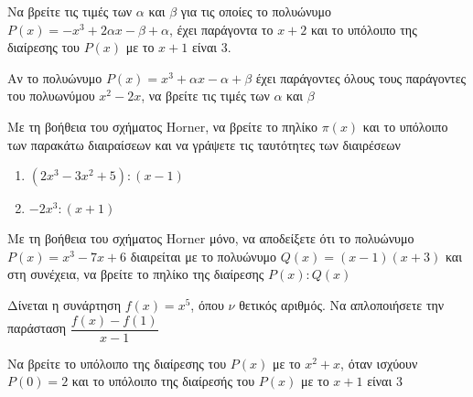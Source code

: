 \documentclass[greek]{beamer}
\begin{document}
\begin{askisi}
  Να βρείτε τις τιμές των $α$ και $β$ για τις οποίες το πολυώνυμο $P(x)=-x^3+2αx-β+α$, έχει παράγοντα το $x+2$ και το υπόλοιπο της διαίρεσης του $P(x)$ με το $x+1$ είναι 3.


\end{askisi}

\begin{askisi}
  Αν το πολυώνυμο $P(x)=x^3+αx-α+β$ έχει παράγοντες όλους τους παράγοντες του πολυωνύμου $x^2-2x$, να βρείτε τις τιμές των $α$ και $β$


\end{askisi}

\begin{askisi}
  Με τη βοήθεια του σχήματος Horner, να βρείτε το πηλίκο $π(x)$ και το υπόλοιπο των παρακάτω διαιραίσεων και να γράψετε τις ταυτότητες των διαιρέσεων
  \begin{enumerate}
    \item<1-> $(2x^3-3x^2+5):(x-1)$
    \item<2-> $-2x^3:(x+1)$
  \end{enumerate}


\end{askisi}

\begin{askisi}
  Με τη βοήθεια του σχήματος Horner μόνο, να αποδείξετε ότι το πολυώνυμο $P(x)=x^3-7x+6$ διαιρείται με το πολυώνυμο $Q(x)=(x-1)(x+3)$ και στη συνέχεια, να βρείτε το πηλίκο της διαίρεσης $P(x):Q(x)$


\end{askisi}

\begin{askisi}
  Δίνεται η συνάρτηση $f(x)=x^5$, όπου $ν$ θετικός αριθμός. Να απλοποιήσετε την παράσταση $\dfrac{f(x)-f(1)}{x-1}$


\end{askisi}

\begin{askisi}
  Να βρείτε το υπόλοιπο της διαίρεσης του $P(x)$ με το $x^2+x$, όταν ισχύουν $P(0)=2$ και το υπόλοιπο της διαίρεσής του $P(x)$ με το $x+1$ είναι $3$


\end{askisi}
\end{document}
